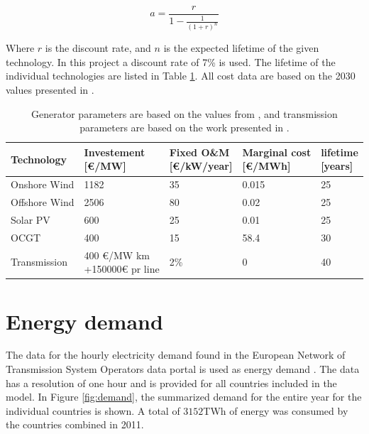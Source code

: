 \begin{equation}\label{eq:annuity}
a = \frac{r}{1 - \frac{1}{(1+r)^n}}
\end{equation}

Where $r$ is the discount rate, and $n$ is the expected lifetime of the given technology. In this project a discount rate of 7\% \cite{PyPSA_euro_30_model} is used. The lifetime of the individual technologies are listed in Table \ref{tab:cost_data}. All cost data are based on the 2030 values presented in \cite{Schroder2013Current}.

\begin{table}[]
	\begin{tabular}{l|llll}
		Technology      & \makecell[c]{Investement \\ {[}€/MW{]}}    & \makecell[c]{Fixed O\&M \\ {[}€/kW/year{]}} & \makecell[c]{Marginal cost \\ {[}€/MWh{]}}    & \makecell[c]{lifetime \\ {[}years{]}} \\ \hline
		Onshore Wind    &       1182          &   35      &   0.015       &   25       \\
		Offshore Wind    &        2506        &    80        &    0.02        &    25        \\
		Solar PV           &       600            &   25      &   0.01        &   25       \\
		OCGT               &       400            &   15      &   58.4        &   30      \\
		Transmission    &   \makecell[l]{ 400 €/MW km \\ +150000€ pr line}  & 2\% & 0         &   40 
	\end{tabular}
	\caption{Generator parameters are based on the values from \cite{Schroder2013Current}, and transmission parameters are based on the work presented in \cite{HAGSPIEL2014654}.}
	\label{tab:cost_data}
\end{table}

\section{Energy demand}
The data for the hourly electricity demand found in the European Network of Transmission System Operators data portal is used as energy demand \cite{ENTSO-E}. The data has a resolution of one hour and is provided for all countries included in the model. In Figure \ref{fig:demand}, the summarized demand for the entire year for the individual countries is shown. A total of $3152$TWh of energy was consumed by the countries combined in 2011. 


